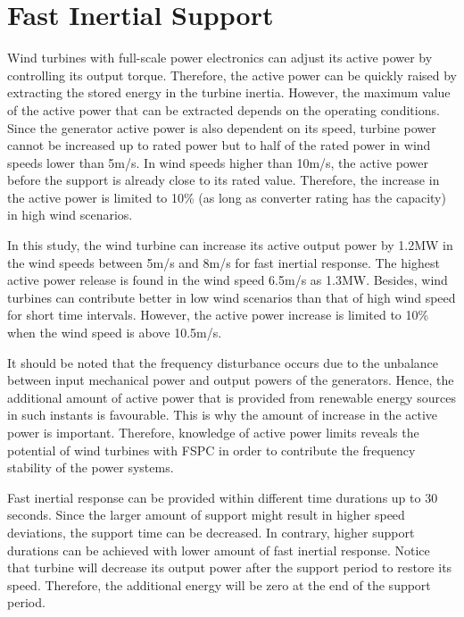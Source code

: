 \section{Fast Inertial Support}
Wind turbines with full-scale power electronics can adjust its active power by controlling its output torque. Therefore, the active power can be quickly raised by extracting the stored energy in the turbine inertia. However, the maximum value of the active power that can be extracted depends on the operating conditions. Since the generator active power is also dependent on its speed, turbine power cannot be increased up to rated power but to half of the rated power in wind speeds lower than 5m/s. In wind speeds higher than 10m/s, the active power before the support is already close to its rated value. Therefore, the increase in the active power is limited to 10\% (as long as converter rating has the capacity) in high wind scenarios. \par
In this study, the wind turbine can increase its active output power by 1.2MW in the wind speeds between 5m/s and 8m/s for fast inertial response. The highest active power release is found in the wind speed 6.5m/s as 1.3MW. Besides, wind turbines can contribute better in low wind scenarios than that of high wind speed for short time intervals. However, the active power increase is limited to 10\% when the wind speed is above 10.5m/s.\par
It should be noted that the frequency disturbance occurs due to the unbalance between input mechanical power and output powers of the generators. Hence, the additional amount of active power that is provided from renewable energy sources in such instants is favourable. This is why the amount of increase in the active power is important. Therefore, knowledge of active power limits reveals the potential of wind turbines with FSPC in order to contribute the frequency stability of the power systems.\par
Fast inertial response can be provided within different time durations up to 30 seconds. Since the larger amount of support might result in higher speed deviations, the support time can be decreased. In contrary, higher support durations can be achieved with lower amount of fast inertial response. Notice that turbine will decrease its output power after the support period to restore its speed. Therefore, the additional energy will be zero at the end of the support period. \par
